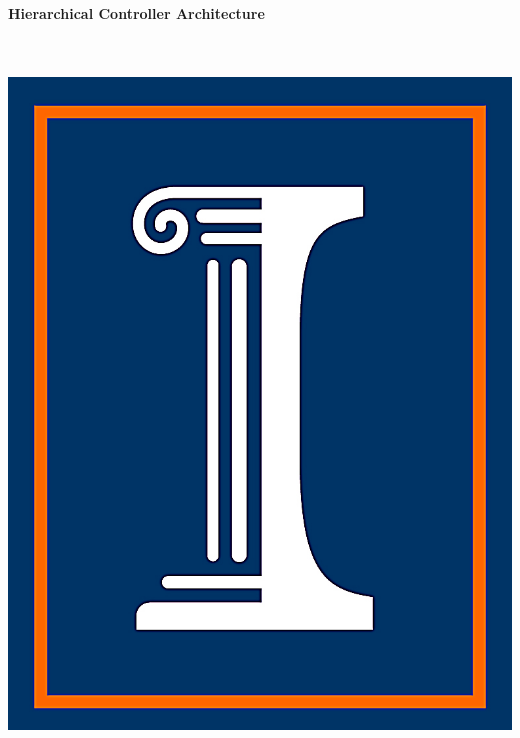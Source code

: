 \documentclass[portrait,a1]{a0poster}
\begin{document}




\begin{minipage}[b]{0.85\linewidth}
\Huge \color{NavyBlue} \textbf{Hierarchical Controller Architecture} \color{Black}\\ %
\Huge\color{NavyBlue}\\[1cm] %
\Large {}\\[0.5cm] %

\end{minipage}
%
\begin{minipage}[b]{0.15\linewidth}
\includegraphics[scale=1]{UIUC_logo.png}\\
\end{minipage}
\end{document}
